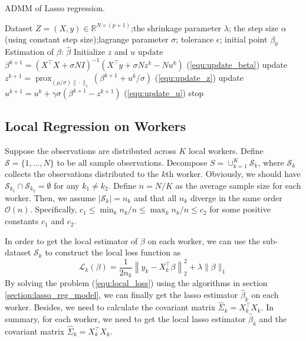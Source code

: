 \documentclass[11pt,en,authoryear]{elegantpaper}
\numberwithin{equation}{section}
\newcommand{\mbR}{\mathbb{R}}
\newcommand{\mS}{\mathcal{S}}
\begin{document}
\begin{center}
\begin{minipage}{13.5cm}
	  \begin{algorithm}[H]
  \caption{ADMM of Lasso regression.}\label{algo:admm_lasso}
  \begin{algorithmic}[1]
    \Require
      Dataset $Z = (X, y) \in \mbR^{N \times (p+1)}$;the shrinkage parameter $\lambda$;  the step size $\alpha$ (using constant step size);lagrange parameter $\sigma$; tolerance $\epsilon$; initial point $\beta_0$
    \Ensure Estimation of $\beta$: $\hat{\beta}$
    \State Initialize $z$ and $u$
    {
    \State update $\beta^{k+1}=\left(X^{\top} X+\sigma N  I\right)^{-1}\left(X^{\top} y+\sigma N z^{k}- N u^{k}\right)$ \quad (\ref{equ:update_beta})
    \State update $z^{k+1}=\operatorname{prox}_{(\mu / \sigma)\|\cdot\|_{1}}\left({\beta}^{k+1}+u^{k} / \sigma\right)$ \quad (\ref{equ:update_z})
    \State update $u^{k+1}=u^{k}+\gamma \sigma\left({\beta}^{k+1}-z^{k+1}\right)$ \quad (\ref{equ:update_u})
    \State stop
    \EndIf
    }
    \EndFor
  \end{algorithmic}
\end{algorithm}
\end{minipage}
\end{center}

\subsection{Local Regression on Workers}
Suppose the observations are distributed across $K$ local workers. Define $\mS = \{1,\ldots,N\}$ to be all sample observations. Decompose $S=\cup_{k=1}^{K} \mathcal{S}_{k}$, where $\mS_k$ collects the observations distributed to the $k$th worker. Obviously, we should have $\mathcal{S}_{k_{1}} \cap \mathcal{S}_{k_{2}}=\emptyset$ for any $k_{1} \neq k_{2}$. Define $n = N/K$ as the average sample size for each worker. Then, we assume $\left|\mathcal{S}_{k}\right|=n_{k}$ and that all $n_k$ diverge in the same order $\mathcal{O}(n)$. Specifically, $c_{1} \leq \min _{k} n_{k} / n \leq \max _{k} n_{k} / n \leq c_{2}$ for some positive constants $c_1$ and $c_2$.

In order to get the local estimator of $\beta$ on each worker, we can use the sub-dataset $\mS_k$ to construct the local loss function as 
\begin{equation}\label{equ:local_loss}
    \mathcal{L}_k(\beta) = \frac{1}{2n_k} \left\|y_{k} - X_k^{\top}\beta \right\|_2^2 + \lambda \|\beta \|_1
\end{equation}
By solving the problem (\ref{equ:local_loss}) using the algorithms in section \ref{section:lasso_reg_model}, we can finally get the lasso estimator $\hat{\beta}_k$ on each worker. Besides, we need to calculate the covariant matrix $\hat{\Sigma}_k = X_k^{\top}X_k$. In summary, for each worker, we need to get the local lasso estimator $\hat{\beta}_k$ and the covariant matrix $\hat{\Sigma}_k = X_k^{\top}X_k$.
\end{document}

